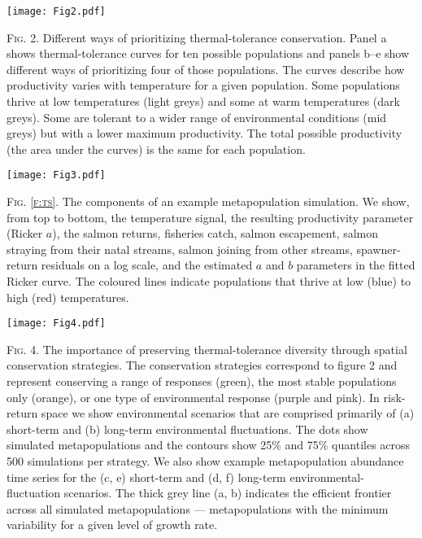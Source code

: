 \documentclass[12pt,english]{article}
\begin{document}
\begin{spacing}{1.3}
\clearpage

\begin{center}
\texttt{[image: Fig2.pdf]}
\end{center}
\bigskip
\noindent
\textsc{Fig. 2}. Different ways of prioritizing thermal-tolerance conservation. Panel a shows thermal-tolerance curves for ten possible populations and panels b--e show different ways of prioritizing four of those populations. The curves describe how productivity varies with temperature for a given population. Some populations thrive at low temperatures (light greys) and some at warm temperatures (dark greys). Some are tolerant to a wider range of environmental conditions (mid greys) but with a lower maximum productivity. The total possible productivity (the area under the curves) is the same for each population.

\clearpage

\begin{center}
\texttt{[image: Fig3.pdf]}
\end{center}
\bigskip
\noindent
\textsc{Fig. \ref{f:ts}}. The components of an example metapopulation simulation. We show, from top to bottom, the temperature signal, the resulting productivity parameter (Ricker $a$), the salmon returns, fisheries catch, salmon escapement, salmon straying from their natal streams, salmon joining from other streams, spawner-return residuals on a log scale, and the estimated $a$ and $b$ parameters in the fitted Ricker curve. The coloured lines indicate populations that thrive at low (blue) to high (red) temperatures.

\clearpage

\begin{center}
\texttt{[image: Fig4.pdf]}
\end{center}
\bigskip
\noindent
\textsc{Fig. 4}. The importance of preserving thermal-tolerance diversity through spatial conservation strategies. The conservation strategies correspond to figure 2 and represent conserving a range of responses (green), the most stable populations only (orange), or one type of environmental response (purple and pink). In risk-return space we show environmental scenarios that are comprised primarily of (a) short-term and (b) long-term environmental fluctuations. The dots show simulated metapopulations and the contours show 25\% and 75\% quantiles across 500 simulations per strategy. We also show example metapopulation abundance time series for the (c, e) short-term and (d, f) long-term environmental-fluctuation scenarios. The thick grey line (a, b) indicates the efficient frontier across all simulated metapopulations --- metapopulations with the minimum variability for a given level of growth rate.


\end{spacing}
\end{document}
